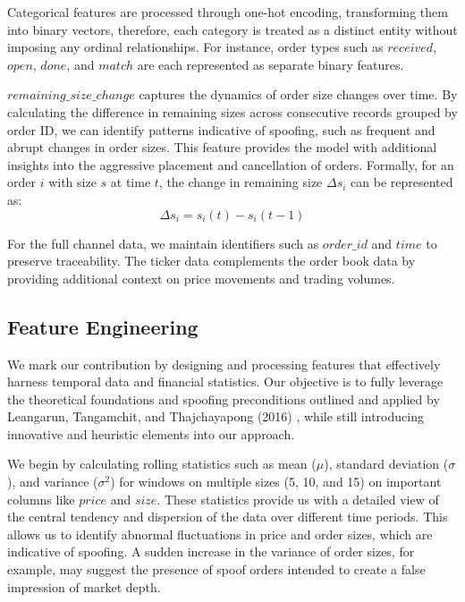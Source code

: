 \documentclass[conference]{IEEEtran}
\begin{document}
\par Categorical features are processed through one-hot encoding, transforming them into binary vectors, therefore, each category is treated as a distinct entity without imposing any ordinal relationships. For instance, order types such as $received$, $open$, $done$, and $match$ are each represented as separate binary features. 

\par $remaining\_size\_change$ captures the dynamics of order size changes over time. By calculating the difference in remaining sizes across consecutive records grouped by order ID, we can identify patterns indicative of spoofing, such as frequent and abrupt changes in order sizes. This feature provides the model with additional insights into the aggressive placement and cancellation of orders. Formally, for an order $i$ with size $s$ at time $t$, the change in remaining size $\Delta s_i$ can be represented as:
\begin{equation}
\Delta s_i = s_i(t) - s_i(t-1)
\end{equation}

\par For the full channel data, we maintain identifiers such as $order\_id$ and $time$ to preserve traceability. The ticker data complements the order book data by providing additional context on price movements and trading volumes.

\subsection{Feature Engineering}
\par We mark our contribution by designing and processing features that effectively harness temporal data and financial statistics. Our objective is to fully leverage the theoretical foundations and spoofing preconditions outlined and applied by Leangarun, Tangamchit, and Thajchayapong (2016) \cite{Leang_2016}, while still introducing innovative and heuristic elements into our approach. 

\par We begin by calculating rolling statistics such as mean ($\mu$), standard deviation ($\sigma$), and variance ($\sigma^2$) for windows on multiple sizes (5, 10, and 15) on important columns like $price$ and $size$. These statistics provide us with a detailed view of the central tendency and dispersion of the data over different time periods. This allows us to identify abnormal fluctuations in price and order sizes, which are indicative of spoofing. A sudden increase in the variance of order sizes, for example, may suggest the presence of spoof orders intended to create a false impression of market depth.
\end{document}
